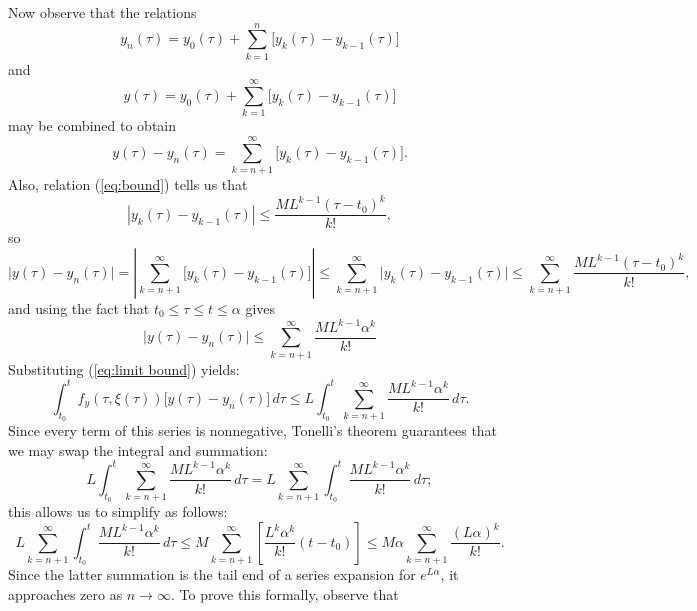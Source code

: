 \documentclass{myart}
\newcommand{\eq}[1]{(\ref{eq:#1})}
\begin{document}
Now observe that the relations
\begin{equation*}
y_n(\tau) = y_0(\tau) + \sum_{k=1}^n \Big[y_k(\tau) - y_{k-1}(\tau)\Big]
\end{equation*}
and
\begin{equation*}
y(\tau) = y_0(\tau) + \sum_{k=1}^\infty \Big[y_k(\tau) - y_{k-1}(\tau)\Big]
\end{equation*}
may be combined to obtain
\begin{equation*}
y(\tau) - y_n(\tau) = \sum_{k=n+1}^\infty \Big[y_k(\tau) - y_{k-1}(\tau)\Big].
\end{equation*}
Also, relation \eq{bound} tells us that
\begin{equation*}
|y_k(\tau) - y_{k-1}(\tau)| \leq \frac{ML^{k-1}(\tau - t_0)^k}{k!},
\end{equation*}
so
\begin{equation*}
\Big|y(\tau) - y_n(\tau)\Big| = \left|\sum_{k=n+1}^\infty \Big[y_k(\tau) - y_{k-1}(\tau)\Big]\right| \leq \sum_{k=n+1}^\infty \Big|y_k(\tau) - y_{k-1}(\tau)\Big| \leq \sum_{k=n+1}^\infty \frac{ML^{k-1}(\tau - t_0)^k}{k!},
\end{equation*}
and using the fact that $t_0 \leq \tau \leq t \leq \alpha$ gives
\begin{equation} \label{eq:limit bound}
\Big|y(\tau) - y_n(\tau)\Big| \leq \sum_{k=n+1}^\infty \frac{ML^{k-1}\alpha^k}{k!}
\end{equation}
Substituting \eq{limit bound} yields:
\begin{equation*}
\int_{t_0}^t f_y(\tau, \xi(\tau)) \Big[y(\tau) - y_n(\tau)\Big] \,d\tau \leq L \int_{t_0}^t \sum_{k=n+1}^\infty \frac{ML^{k-1}\alpha^k}{k!} \,d\tau.
\end{equation*}
Since every term of this series is nonnegative, Tonelli's theorem guarantees that we may swap the integral and summation:
\begin{equation*}
L \int_{t_0}^t \sum_{k=n+1}^\infty \frac{ML^{k-1}\alpha^k}{k!} \,d\tau = L \sum_{k=n+1}^\infty \int_{t_0}^t \frac{ML^{k-1}\alpha^k}{k!} \,d\tau;
\end{equation*}
this allows us to simplify as follows:
\begin{equation*}
L \sum_{k=n+1}^\infty \int_{t_0}^t \frac{ML^{k-1}\alpha^k}{k!} \,d\tau \leq M \sum_{k=n+1}^\infty \left[\frac{L^k\alpha^k}{k!} (t - t_0)\right] \leq M\alpha \sum_{k=n+1}^\infty \frac{(L\alpha)^k}{k!}.
\end{equation*}
Since the latter summation is the tail end of a series expansion for $e^{L\alpha}$, it approaches zero as $n \to \infty$. To prove this formally, observe that
\end{document}
